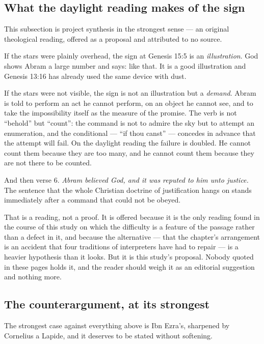 \subsection{What the daylight reading makes of the sign}

This subsection is project synthesis in the strongest sense --- an original
theological reading, offered as a proposal and attributed to no source.

If the stars were plainly overhead, the sign at Genesis 15:5 is an
\emph{illustration}. God shows Abram a large number and says: like that. It is a
good illustration and Genesis 13:16 has already used the same device with dust.

If the stars were not visible, the sign is not an illustration but a
\emph{demand}. Abram is told to perform an act he cannot perform, on an object he
cannot see, and to take the impossibility itself as the measure of the promise.
The verb is not ``behold'' but ``count'': the command is not to admire the sky
but to attempt an enumeration, and the conditional --- ``if thou canst'' ---
concedes in advance that the attempt will fail. On the daylight reading the
failure is doubled. He cannot count them because they are too many, and he cannot
count them because they are not there to be counted.

And then verse 6. \emph{Abram believed God, and it was reputed to him unto
justice.} The sentence that the whole Christian doctrine of justification hangs
on stands immediately after a command that could not be obeyed.

That is a reading, not a proof. It is offered because it is the only reading
found in the course of this study on which the difficulty is a feature of the
passage rather than a defect in it, and because the alternative --- that the
chapter's arrangement is an accident that four traditions of interpreters have
had to repair --- is a heavier hypothesis than it looks. But it is this study's
proposal. Nobody quoted in these pages holds it, and the reader should weigh it
as an editorial suggestion and nothing more.

\subsection{The counterargument, at its strongest}

The strongest case against everything above is Ibn Ezra's, sharpened by
Cornelius a Lapide, and it deserves to be stated without softening.

